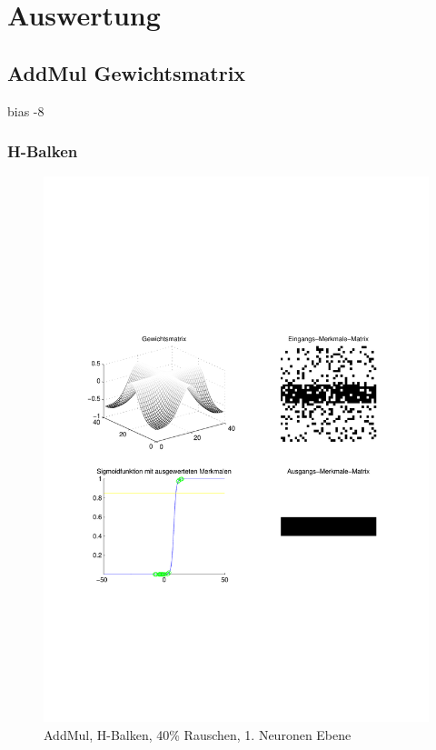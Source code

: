 \newpage
\section{Auswertung}

\newpage
\subsection{AddMul Gewichtsmatrix}
bias -8
\subsubsection{H-Balken}
\begin{figure}[hbt]
	\begin{minipage}{0.8 \textwidth}
		\includegraphics[width=\textwidth]{./Bilder/Auswertung/Endergebnis/TypeAddMul_Rauschen40_H_Line_Layer1}
		\caption{AddMul, H-Balken, 40\% Rauschen, 1. Neuronen Ebene}

\end{minipage}
\end{figure}
